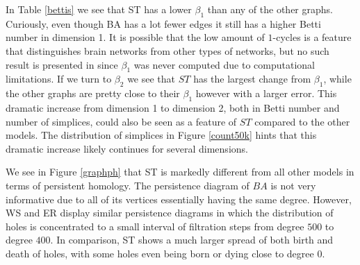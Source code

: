 In Table \ref{bettis} we see that ST has a lower $\beta_{1}$ than any of the other graphs. Curiously, even though BA has a lot fewer edges it still has a higher Betti number in dimension 1. It is possible that the low amount of $1$-cycles is a feature that distinguishes brain networks from other types of networks, but no such result is presented in \cite{reimann} since $\beta_{1}$ was never computed due to computational limitations. If we turn to $\beta_{2}$ we see that $ST$ has the largest change from $\beta_{1}$, while the other graphs are pretty close to their $\beta_{1}$ however with a larger error. This dramatic increase from dimension 1 to dimension 2, both in Betti number and number of simplices, could also be seen as a feature of $ST$ compared to the other models. The distribution of simplices in Figure \ref{count50k} hints that this dramatic increase likely continues for several dimensions.

We see in Figure \ref{graphph} that ST is markedly different from all other models in terms of persistent homology. The persistence diagram of $BA$ is not very informative due to all of its vertices essentially having the same degree. However, WS and ER display similar persistence diagrams in which the distribution of holes is concentrated to a small interval of filtration steps from degree $500$ to degree $400$. In comparison, ST shows a much larger spread of both birth and death of holes, with some holes even being born or dying close to degree $0$.

